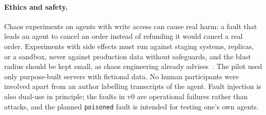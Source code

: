 \paragraph{Ethics and safety.} Chaos experiments on agents with write access can cause real harm: a fault that leads an agent to cancel an order instead of refunding it would cancel a real order. Experiments with side effects must run against staging systems, replicas, or a sandbox, never against production data without safeguards, and the blast radius should be kept small, as chaos engineering already advises~\cite{principlesofchaos}. The pilot used only purpose-built servers with fictional data. No human participants were involved apart from an author labelling transcripts of the agent. Fault injection is also dual-use in principle; the faults in v0 are operational failures rather than attacks, and the planned \texttt{poisoned} fault is intended for testing one's own agents.

